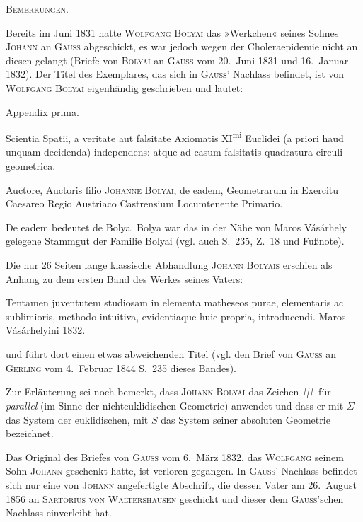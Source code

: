 %
\begin{center}\textsc{Bemerkungen.}\end{center}
\begingroup\small
Bereits im Juni 1831 hatte \textsc{Wolfgang Bolyai} das »Werkchen« seines Sohnes \textsc{Johann} an \textsc{Gauss} abgeschickt, es war jedoch wegen der Choleraepidemie nicht an diesen gelangt (Briefe von \textsc{Bolyai} an \textsc{Gauss} vom 20.~Juni 1831 und 16.~Januar 1832). Der Titel des Exemplares, das sich in \textsc{Gauss}' Nachlass befindet, ist von \textsc{Wolfgang Bolyai} eigenhändig geschrieben und lautet:
\begin{center}Appendix prima.\end{center}
\noindent Scientia Spatii, a veritate aut falsitate Axiomatis XI\textsuperscript{mi} Euclidei (a priori haud unquam decidenda) independens: atque ad casum falsitatis quadratura circuli geometrica.

Auctore, Auctoris filio \textsc{Johanne Bolyai}, de eadem, Geometrarum in Exercitu Caesareo Regio Austriaco Castrensium Locumtenente Primario.

De eadem bedeutet de Bolya. Bolya war das in der Nähe von Maros Vásárhely gelegene Stammgut der Familie Bolyai (vgl. auch S.~235, Z.~18 und Fußnote).

Die nur 26 Seiten lange klassische Abhandlung \textsc{Johann Bolyais} erschien als Anhang zu dem ersten Band des Werkes seines Vaters:

Tentamen juventutem studiosam in elementa matheseos purae, elementaris ac sublimioris, methodo intuitiva, evidentiaque huic propria, introducendi. Maros Vásárhelyini 1832.

\noindent und führt dort einen etwas abweichenden Titel (vgl. den Brief von \textsc{Gauss} an \textsc{Gerling} vom 4.~Februar 1844 S.~235 dieses Bandes).

Zur Erläuterung sei noch bemerkt, dass \textsc{Johann Bolyai} das Zeichen $\TripleParallel$ für \emph{parallel} (im Sinne der nichteuklidischen Geometrie) anwendet und dass er mit $\Sigma$ das System der euklidischen, mit $S$ das System seiner absoluten Geometrie bezeichnet.

Das Original des Briefes von \textsc{Gauss} vom 6.~März 1832, das \textsc{Wolfgang} seinem Sohn \textsc{Johann} geschenkt hatte, ist verloren gegangen. In \textsc{Gauss}' Nachlass befindet sich nur eine von \textsc{Johann} angefertigte Abschrift, die dessen Vater am 26.~August 1856 an \textsc{Sartorius von Waltershausen} geschickt und dieser dem \textsc{Gauss}'schen Nachlass einverleibt hat.


